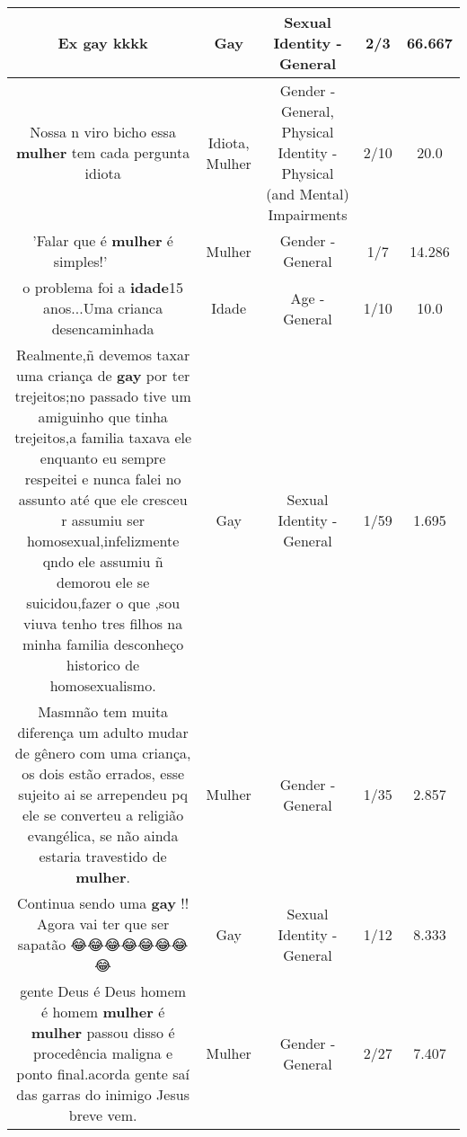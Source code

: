 \documentclass[11pt]{article}
\newlength\mylength
\begin{document}
\begin{center}
\begin{longtable}{|C{.65\mylength}|C{.30\mylength}|C{.12\mylength}|C{.12\mylength}|C{.12\mylength}|}
  \small Ex \textbf{gay} kkkk\normalsize   & Gay & Sexual Identity - General & 2/3 & 66.667 \\  \hline
  \small Nossa n viro bicho essa \textbf{mulher} tem cada pergunta idiota\normalsize   & Idiota, Mulher & Gender - General, Physical Identity - Physical (and Mental) Impairments & 2/10 & 20.0 \\  \hline
  \small 'Falar que é \textbf{mulher} é simples!' 👏🏼👏🏼👏🏼👏🏼👏🏼\normalsize   & Mulher & Gender - General & 1/7 & 14.286 \\  \hline
  \small o problema foi a \textbf{idade}15 anos...Uma crianca desencaminhada\normalsize   & Idade & Age - General & 1/10 & 10.0 \\  \hline
  \small Realmente,ñ devemos taxar uma criança de \textbf{gay} por ter trejeitos;no passado tive um amiguinho que tinha trejeitos,a familia taxava ele enquanto eu sempre respeitei e nunca falei no assunto até que ele cresceu r assumiu ser homosexual,infelizmente qndo ele assumiu ñ demorou ele se suicidou,fazer o que ,sou viuva tenho tres filhos na minha familia desconheço historico de homosexualismo.\normalsize   & Gay & Sexual Identity - General & 1/59 & 1.695 \\  \hline
  \small Masmnão tem muita diferença um adulto mudar de gênero com uma criança, os dois estão errados, esse sujeito ai se arrependeu pq ele se converteu a religião evangélica, se não ainda estaria travestido de \textbf{mulher}.\normalsize   & Mulher & Gender - General & 1/35 & 2.857 \\  \hline
  \small Continua sendo uma \textbf{gay} !! Agora vai ter que ser sapatão 😂😂😂😂😂😂😂😂\normalsize   & Gay & Sexual Identity - General & 1/12 & 8.333 \\  \hline
  \small gente Deus é Deus homem é homem \textbf{mulher} é \textbf{mulher} passou disso é procedência maligna e ponto final.acorda gente saí das garras do inimigo Jesus breve vem.\normalsize   & Mulher & Gender - General & 2/27 & 7.407 \\  \hline

\end{longtable}
\end{center}
\end{document}
